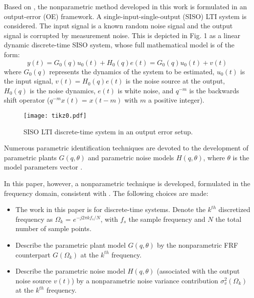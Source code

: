 Based on \cite{schoukens2010nonparametric}, the nonparametric method developed in this work is formulated in an output-error (OE) framework. A single-input-single-output (SISO) LTI system is considered. %
The input signal is a known random noise signal and the output signal is corrupted by measurement noise. This is depicted in Fig. 1 as a linear dynamic discrete-time SISO system, whose full mathematical model is of the form:
\begin{equation}\label{lpmtd1}
y(t)=G_0(q)u_0(t)+H_0(q)e(t)=G_0(q)u_0(t)+v(t)
\end{equation}
where $G_0(q)$ represents the dynamics of the system to be estimated, $u_0(t)$ is the input signal, $v(t)= H_0(q)e(t)$ is the noise source at the output, $H_0(q)$ is the noise dynamics, $e(t)$ is white noise, and $q^{-m}$ is the backwards shift operator ($q^{-m}x(t)$ = $x(t-m)$  with $m$ a positive integer). %

\begin{figure}[tbh] %
\centering
%
\texttt{[image: tikz0.pdf]}
\caption{SISO LTI discrete-time system in an output error setup.}
\label{lpmtdrep}
\end{figure}

Numerous parametric identification techniques are devoted to the development of parametric plants $G(q,\theta)$ and parametric noise models  $H(q,\theta)$, where  $\theta$ is the model parameters vector  \cite{Ljung1999,Soderstrom1989}. 

In this paper, however, a nonparametric technique is developed, %
formulated in the frequency domain, consistent with \cite{FDidentEd2Pintelon,Mahata2006}. The following  choices are made:

\begin{itemize}

\item

The work in this paper is for discrete-time systems. Denote the $k^{th}$ discretized frequency as $\Omega_k$ = $e^{-j2{\pi}kf_s/N}$, with $f_s$ the sample frequency and $N$ the total number of sample points.
\item

Describe the parametric plant model  $G(q,\theta)$ by the nonparametric FRF counterpart  $G(\Omega_k)$  at the $k^{th}$ frequency. 
\item

Describe  the parametric noise model $H(q,\theta)$ (associated with the output noise source $v(t)$) by a nonparametric noise variance contribution $\sigma^2_v(\Omega_k)$ at the $k^{th}$ frequency.

\end{itemize}

